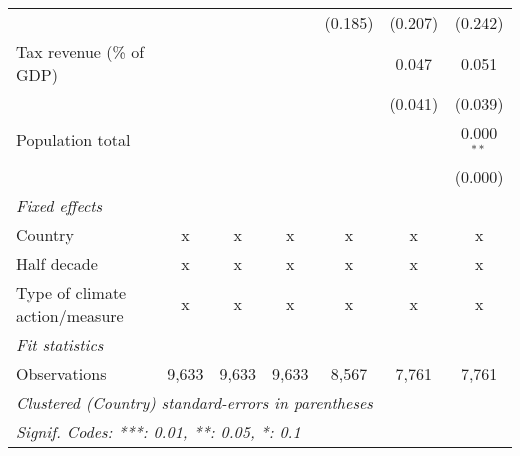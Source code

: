 \begin{tabular}{lcccccc}
                                                      &              &              &               & (0.185)       & (0.207)      & (0.242)\\   
   Tax revenue (\% of GDP)                            &              &              &               &               & 0.047        & 0.051\\   
                                                      &              &              &               &               & (0.041)      & (0.039)\\   
   Population total                                   &              &              &               &               &              & 0.000$^{**}$\\   
                                                      &              &              &               &               &              & (0.000)\\   
   \emph{Fixed effects}\\
   Country                                            & x            & x            & x             & x             & x            & x\\  
   Half decade                                        & x            & x            & x             & x             & x            & x\\  
   Type of climate action/measure                     & x            & x            & x             & x             & x            & x\\  
   \midrule \emph{Fit statistics}\\
   Observations                                       & 9,633        & 9,633        & 9,633         & 8,567         & 7,761        & 7,761\\  
   \midrule
   \multicolumn{7}{l}{\emph{Clustered (Country) standard-errors in parentheses}}\\
   \multicolumn{7}{l}{\emph{Signif. Codes: ***: 0.01, **: 0.05, *: 0.1}}\\
\end{tabular}
\par\endgroup


